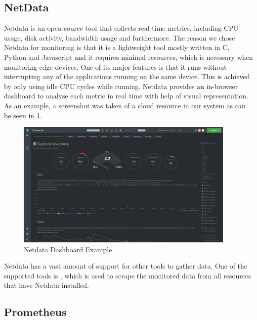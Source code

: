   \subsection{NetData}
  \label{sec:netdata-third-party}

    Netdata \cite{netdataGettingStartedLearn2023} is an open-source tool that collects real-time metrics, including CPU usage, disk activity, bandwidth usage and furthermore.
    The reason we chose Netdata for monitoring is that it is a lightweight tool mostly written in C, Python and Javascript and it requires minimal resources, which is necessary when monitoring edge devices.
    One of its major features is that it runs without interrupting any of the applications running on the same device. This is achieved by only using idle CPU cycles while running.
    Netdata provides an in-browser dashboard to analyse each metric in real time with help of visual representation. As an example, a screenshot was taken of a cloud resource in our system as can be seen in \ref{fig:netdata-dashboard}.
    \begin{figure}[h!]
        \centering
        \includegraphics[width=0.95\textwidth]{figures/netdata.png}
        \caption{Netdata Dashboard Example}
        \label{fig:netdata-dashboard}
    \end{figure}
    Netdata has a vast amount of support for other tools to gather data. 
    One of the supported tools is , which is used to scrape the monitored data from all resources that have Netdata installed. 

  \subsection{Prometheus}
  \label{sec:prometheus-third-party}
  
